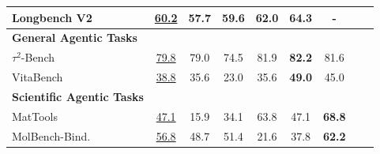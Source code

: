 \begin{table}[]
\begin{tabular}{@{}lcccccccc@{}}
    Longbench V2~\citep{LongBench} & \underline{60.2} & 57.7 & 59.6 & 62.0 & \textbf{64.3} & -\\
    \midrule
    \textbf{General Agentic Tasks} & & & & & & \\
    \midrule
    $\tau^2$-Bench~\citep{barres2025tau2} & \underline{79.8} & 79.0 & 74.5 & 81.9 & \textbf{82.2} & 81.6 \\
    VitaBench~\citep{he2025vitabench} & \underline{38.8} & 35.6 & 23.0 & 35.6 & \textbf{49.0} & 45.0 \\
    \midrule
    \textbf{Scientific Agentic Tasks} & & & & & & \\
    \midrule
    MatTools~\citep{MatTools} & \underline{47.1} & 15.9 & 34.1 & 63.8 & 47.1 & \textbf{68.8} \\
    MolBench-Bind.~\citep{zhang2026molclaw} & \underline{56.8} & 48.7 & 51.4 & 21.6 & 37.8 & \textbf{62.2} \\
    \bottomrule
    \end{tabular}
\end{table}
